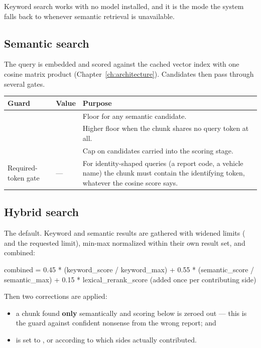 Keyword search works with no model installed, and it is the mode the system
falls back to whenever semantic retrieval is unavailable.

\subsection{Semantic search}

The query is embedded and scored against the cached vector index with one cosine
matrix product (Chapter~\ref{ch:architecture}). Candidates then pass through
several gates.

\begin{longtable}{L{0.34\textwidth} L{0.12\textwidth} L{0.42\textwidth}}
\toprule
\textbf{Guard} & \textbf{Value} & \textbf{Purpose} \\
\midrule
\endfirsthead
\bottomrule
\endfoot
{} &  & Floor for any semantic candidate. \\
 &  & Higher floor when the
chunk shares no query token at all. \\
 &  & Cap on candidates carried into
the scoring stage. \\
Required-token gate & --- & For identity-shaped queries (a report code, a
vehicle name) the chunk must contain the identifying token, whatever the cosine
score says. \\
\end{longtable}

\subsection{Hybrid search}

The default. Keyword and semantic results are gathered with widened limits
( and  the requested limit), min-max normalized within their
own result set, and combined:

\begin{shellblock}
combined = 0.45 * (keyword_score / keyword_max)
         + 0.55 * (semantic_score / semantic_max)
         + 0.15 * lexical_rerank_score      (added once per contributing side)
\end{shellblock}

Then two corrections are applied:

\begin{itemize}
\item a chunk found \textbf{only} semantically and scoring below
 is zeroed out --- this is the guard
against confident nonsense from the wrong report; and
\item {} is set to ,  or
 according to which sides actually contributed.
\end{itemize}

